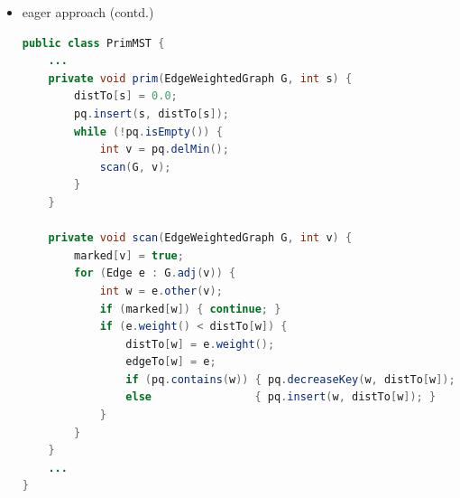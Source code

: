 \documentclass[8pt,a4paper,compress]{beamer}
\begin{document}
\begin{frame}[fragile]
\begin{itemize}
\item eager approach (contd.)

\begin{lstlisting}[language=Java]
public class PrimMST {
    ...
    private void prim(EdgeWeightedGraph G, int s) {
        distTo[s] = 0.0;
        pq.insert(s, distTo[s]);
        while (!pq.isEmpty()) {
            int v = pq.delMin();
            scan(G, v);
        }
    }

    private void scan(EdgeWeightedGraph G, int v) {
        marked[v] = true;
        for (Edge e : G.adj(v)) {
            int w = e.other(v);
            if (marked[w]) { continue; }
            if (e.weight() < distTo[w]) {
                distTo[w] = e.weight();
                edgeTo[w] = e;
                if (pq.contains(w)) { pq.decreaseKey(w, distTo[w]); }
                else                { pq.insert(w, distTo[w]); }
            }
        }
    }
    ...
}
\end{lstlisting}
\end{itemize}
\end{frame}
\end{document}
